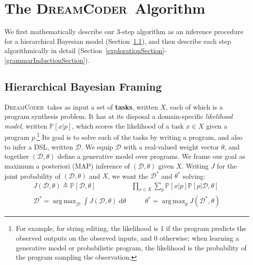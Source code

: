 \documentclass{article}
\newcommand{\system}{\textsc{DreamCoder}~}
\DeclareMathOperator*{\argmax}{arg\,max} %
\newcommand{\probability}{\mathds{P}} %
\begin{document}
\section{The \system Algorithm}

 We first mathematically describe our 3-step algorithm as
 an inference procedure for a hierarchical Bayesian model (Section~\ref{mathematicalFraming}),
  and then describe each step algorithmically in detail (Section~\ref{explorationSection}-\ref{grammarInductionSection}).

 \subsection{Hierarchical Bayesian Framing}\label{mathematicalFraming}

\system takes as input a set of \textbf{tasks}, written $X$, each of which is a program synthesis problem.
It has at its disposal a domain-specific \emph{likelihood model}, written $\probability[x|p]$, which scores the likelihood of a task $x\in X$ given a program $p$.\footnote{For example, for string editing,
  the likelihood is 1 if the program predicts the observed outputs on the observed inputs,
  and 0 otherwise; when learning a generative model or probabilistic program, the likelihood is
the probability of the program sampling the observation.}
Its goal is to solve each of the tasks by writing a program,
and also to infer a DSL, written $\mathcal{D}$.
We equip $\mathcal{D}$ with a real-valued weight vector $\theta$, and together
$(\mathcal{D},\theta)$ define a generative model over programs.
We frame our goal as maximum a posteriori (MAP) inference of $(\mathcal{D},\theta)$ given $X$.
Writing $J$ for the joint probability of $(\mathcal{D},\theta)$ and $X$, we want the $\mathcal{D}^*$ and $\theta^*$ solving:
\begin{align}\label{intractableObjectives}
\nonumber  J(\mathcal{D},\theta)\triangleq \probability[\mathcal{D},\theta]&\prod_{x\in X} \sum_p \probability[x|p]\probability[p|\mathcal{D},\theta]\\
  \mathcal{D}^* = \argmax_{\mathcal{D}}\int J(\mathcal{D},\theta)\;\mathrm{d}\theta &\qquad
  \theta^* =\argmax_\theta J(\mathcal{D}^*,\theta)
\end{align}

\end{document}
